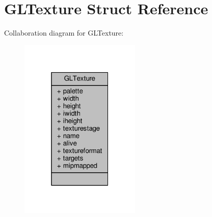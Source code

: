 \hypertarget{structGLTexture}{}\section{G\+L\+Texture Struct Reference}
\label{structGLTexture}


Collaboration diagram for G\+L\+Texture\+:
\nopagebreak
\begin{figure}[H]
\begin{center}
\leavevmode
\includegraphics[width=163pt]{d9/d45/structGLTexture__coll__graph}
\end{center}
\end{figure}
